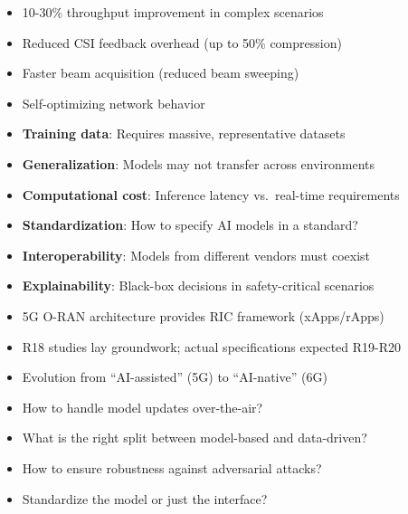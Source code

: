 
\begin{itemize}
\tightlist
\item
  10-30\% throughput improvement in complex scenarios
\item
  Reduced CSI feedback overhead (up to 50\% compression)
\item
  Faster beam acquisition (reduced beam sweeping)
\item
  Self-optimizing network behavior
\end{itemize}


\begin{itemize}
\tightlist
\item
  \textbf{Training data}: Requires massive, representative datasets
\item
  \textbf{Generalization}: Models may not transfer across environments
\item
  \textbf{Computational cost}: Inference latency vs. real-time requirements
\item
  \textbf{Standardization}: How to specify AI models in a standard?
\item
  \textbf{Interoperability}: Models from different vendors must coexist
\item
  \textbf{Explainability}: Black-box decisions in safety-critical scenarios
\end{itemize}


\begin{itemize}
\tightlist
\item
  5G O-RAN architecture provides RIC framework (xApps/\allowbreak{}rApps)
\item
  R18 studies lay groundwork; actual specifications expected R19-R20
\item
  Evolution from ``AI-assisted'' (5G) to ``AI-native'' (6G)
\end{itemize}


\begin{itemize}
\tightlist
\item
  How to handle model updates over-the-air?
\item
  What is the right split between model-based and data-driven?
\item
  How to ensure robustness against adversarial attacks?
\item
  Standardize the model or just the interface?
\end{itemize}

